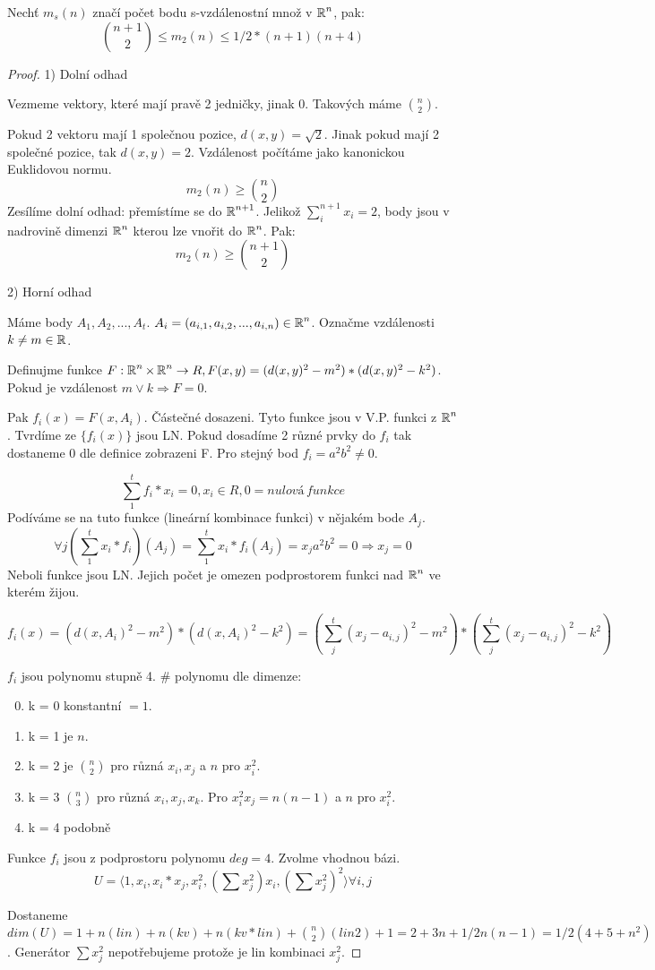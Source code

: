 \begin{theorem}
Nechť $m_s(n)$ značí počet bodu s-vzdálenostní množ v $\operatorname{\mathbb{R}}^n$, pak:
\[ \binom{n+1}{2} \leq m_2(n) \leq 1/2 * (n+1)(n+4) \]
\end{theorem}
\begin{proof}
	1) Dolní odhad

	Vezmeme vektory, které mají pravě 2 jedničky, jinak 0. Takových máme $\binom{n}{2}$.

	Pokud 2 vektoru mají 1 společnou pozice, $d(x,y) = \sqrt{2}$. Jinak pokud mají 2 společné pozice, tak $d(x,y) = 2$. Vzdálenost počítáme jako kanonickou Euklidovou normu.
	\[ m_2(n) \geq \binom{n}{2} \]
	Zesílíme dolní odhad: přemístíme se do $\operatorname{\mathbb{R}}^{n+1}$. Jelikož $ \sum_i^{n+1} x_i = 2 $, body jsou v nadrovině dimenzi $\operatorname{\mathbb{R}}^n$ kterou lze vnořit do $\operatorname{\mathbb{R}}^n$. Pak:
	\[ m_2(n) \geq \binom{n + 1}{2} \]

	2) Horní odhad

	Máme body $A_1, A_2, ..., A_t$. $A_i = (a_{i,1}, a_{i,2}, ..., a_{i,n}) \in \operatorname{\mathbb{R}}^n$. Označme vzdálenosti $k \ne m \in \operatorname{\mathbb{R}}$.

	Definujme funkce $F : \operatorname{\mathbb{R}}^n \times \operatorname{\mathbb{R}}^n \to R, F(x,y) = (d(x,y)^2 - m^2) * (d(x,y)^2 - k^2)$. Pokud je vzdálenost $m \lor k \Rightarrow F = 0$.

	Pak $f_i(x) = F(x, A_i).$ Částečné dosazeni. Tyto funkce jsou v V.P. funkci z $\operatorname{\mathbb{R}}^n$. Tvrdíme ze $\{ f_i(x)\}$ jsou LN.
	Pokud dosadíme 2 různé prvky do $f_i$ tak dostaneme 0 dle definice zobrazeni F. Pro stejný bod $f_i = a^2b^2 \ne 0$.

	\[ \sum_1^t f_i * x_i = 0, x_i \in R, 0 = nulová \, funkce \]
	Podíváme se na tuto funkce (lineární kombinace funkci) v nějakém bode $A_j$.
	\[ \forall j (\sum_1^t x_i * f_i)(A_j) = \sum_1^t x_i * f_i(A_j) = x_j a^2 b^2 = 0 \Rightarrow x_j = 0 \]
	Neboli funkce jsou LN. Jejich počet je omezen podprostorem funkci nad $\operatorname{\mathbb{R}}^n$ ve kterém žijou.

	\[ f_i(x) = (d(x,A_i)^2 - m^2) * (d(x,A_i)^2 - k^2) = (\sum_j^t(x_j - a_{i,j})^2 - m^2)*(\sum_j^t(x_j - a_{i,j})^2 - k^2)\]

	$f_i$ jsou polynomu stupně 4. \# polynomu dle dimenze:
	\begin{enumerate}
		\setcounter{enumii}{-1}
		\item k = 0 konstantní $ = 1$.
		\item k = 1 je $n$.
		\item k = 2 je $\binom{n}{2}$ pro různá $x_i, x_j$ a $n$ pro $x_i^2$.
		\item k = 3 $\binom{n}{3}$ pro různá $x_i, x_j, x_k$. Pro $x_i^2x_j = n(n-1)$ a $n$ pro $x_i^2$.
		\item k = 4 podobně
		\end{enumerate}
		Funkce $f_i$ jsou z podprostoru polynomu $deg = 4$. Zvolme vhodnou bázi.
	\[ U = \langle 1, x_i, x_i*x_j, x_i^2, (\sum x_j^2)x_i, (\sum x_j^2)^2 \rangle \forall i,j \]

	Dostaneme $dim(U) = 1 + n (lin) + n (kv) + n (kv * lin) + \binom{n}{2} (lin 2) + 1 = 2 + 3n + 1/2 n (n-1) = 1/2 (4 + 5 + n^2)$. Generátor $\sum x_j^2$ nepotřebujeme protože je lin kombinaci $x_j^2$.

\end{proof}
